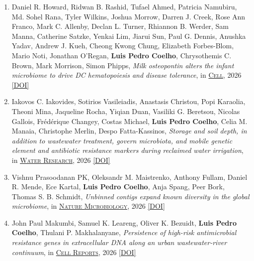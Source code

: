 \documentclass{article}
\newcommand\showdoi[1]{%
    \href{https://doi.org/#1}{[DOI]}%
}
\newcommand\pubname[1]{\textsc{\uline{#1}}}
\begin{document}
\begin{enumerate}[resume]

\item Daniel R. Howard, Ridwan B. Rashid, Tufael Ahmed, Patricia Namubiru, Md. Sohel Rana, Tyler Wilkins, Joshua Morrow, Darren J. Creek, Rose Ann Franco, Mark C. Allenby, Declan L. Turner, Rhiannon B. Werder, Sam Manna, Catherine Satzke, Yenkai Lim, Jiarui Sun, Paul G. Dennis, Anushka Yadav, Andrew J. Kueh, Cheong Kwong Chung, Elizabeth Forbes-Blom, Mario Noti, Jonathan O’Regan, \textbf{Luis Pedro Coelho}, Chrysothemis C. Brown, Mark Morrison, Simon Phipps, \emph{Milk osteopontin alters the infant microbiome to drive DC hematopoiesis and disease tolerance}, in \pubname{Cell}, 2026 \showdoi{10.1016/j.cell.2026.07.022}


\item Iakovos C. Iakovides, Sotirios Vasileiadis, Anastasis Christou, Popi Karaolia, Theoni Mina, Jaqueline Rocha, Yiqian Duan, Vasiliki G. Beretsou, Nicolas Gallois, Frédérique Changey, Costas Michael, \textbf{Luis Pedro Coelho}, Celia M. Manaia, Christophe Merlin, Despo Fatta-Kassinos, \emph{Storage and soil depth, in addition to wastewater treatment, govern microbiota, and mobile genetic element and antibiotic resistance markers during reclaimed water irrigation}, in \pubname{Water Research}, 2026 \showdoi{10.1016/j.watres.2026.125889}

\item Vishnu Prasoodanan PK, Oleksandr M. Maistrenko, Anthony Fullam, Daniel R. Mende, Ece Kartal, \textbf{Luis Pedro Coelho}, Anja Spang, Peer Bork, Thomas S. B. Schmidt, \emph{Unbinned contigs expand known diversity in the global microbiome}, in \pubname{Nature Microbiology}, 2026 \showdoi{10.1038/s41564-026-02314-6}

\item John Paul Makumbi, Samuel K. Leareng, Oliver K. Bezuidt, \textbf{Luis Pedro Coelho}, Thulani P. Makhalanyane, \emph{Persistence of high-risk antimicrobial resistance genes in extracellular DNA along an urban wastewater-river continuum}, in \pubname{Cell Reports}, 2026 \showdoi{10.1016/j.celrep.2026.117128}


\end{enumerate}
\end{document}
